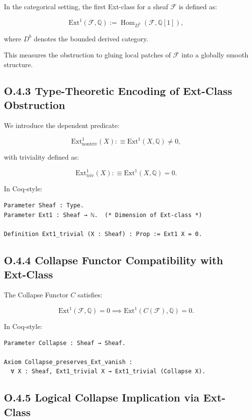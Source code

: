 \documentclass[11pt]{article}
\begin{document}
In the categorical setting, the first Ext-class for a sheaf \( \mathcal{F} \) is defined as:

\[
\mathrm{Ext}^1(\mathcal{F}, \mathbb{Q}) := \operatorname{Hom}_{D^b}\left(\mathcal{F}, \mathbb{Q}[1]\right),
\]

where \( D^b \) denotes the bounded derived category.

This measures the obstruction to gluing local patches of \( \mathcal{F} \) into a globally smooth structure.

\subsection*{O.4.3 Type-Theoretic Encoding of Ext-Class Obstruction}

We introduce the dependent predicate:

\[
\mathrm{Ext}^1_{\mathrm{nontriv}}(X) :\equiv \mathrm{Ext}^1(X, \mathbb{Q}) \neq 0,
\]

with triviality defined as:

\[
\mathrm{Ext}^1_{\mathrm{triv}}(X) :\equiv \mathrm{Ext}^1(X, \mathbb{Q}) = 0.
\]

In Coq-style:

\begin{lstlisting}[language=Coq]
Parameter Sheaf : Type.
Parameter Ext1 : Sheaf → ℕ.  (* Dimension of Ext-class *)

Definition Ext1_trivial (X : Sheaf) : Prop := Ext1 X = 0.
\end{lstlisting}

\subsection*{O.4.4 Collapse Functor Compatibility with Ext-Class}

The Collapse Functor \( C \) satisfies:

\[
\mathrm{Ext}^1(\mathcal{F}, \mathbb{Q}) = 0 \implies \mathrm{Ext}^1(C(\mathcal{F}), \mathbb{Q}) = 0.
\]

In Coq-style:

\begin{lstlisting}[language=Coq]
Parameter Collapse : Sheaf → Sheaf.

Axiom Collapse_preserves_Ext_vanish :
  ∀ X : Sheaf, Ext1_trivial X → Ext1_trivial (Collapse X).
\end{lstlisting}

\subsection*{O.4.5 Logical Collapse Implication via Ext-Class}
\end{document}
